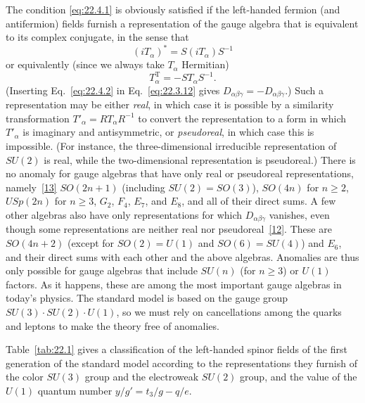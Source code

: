 The condition \eqref{eq:22.4.1} is obviously satisfied if the left-handed
fermion (and antifermion) fields furnish a representation of the gauge
algebra that is equivalent to its complex conjugate, in the sense that
\[
 (iT_\alpha)^*=S(iT_\alpha)S^{-1}
\]
or equivalently (since we always take $T_\alpha$ Hermitian)
\begin{equation}
 T_\alpha^{\mathrm T}=-S T_\alpha S^{-1}.
 \tag{22.4.2}\label{eq:22.4.2}
\end{equation}
(Inserting Eq.~\eqref{eq:22.4.2} in Eq.~\eqref{eq:22.3.12} gives
$D_{\alpha\beta\gamma}=-D_{\alpha\beta\gamma}$.) Such a representation
may be either \emph{real}, in which case it is possible by a similarity
transformation $T'_\alpha=R T_\alpha R^{-1}$ to convert the representation
to a form in which $T'_\alpha$ is imaginary and antisymmetric, or
\emph{pseudoreal}, in which case this is impossible. (For instance, the
three-dimensional irreducible representation of $SU(2)$ is real, while
the two-dimensional representation is pseudoreal.) There is no anomaly
for gauge algebras that have only real or pseudoreal representations,
namely~\hyperref[ch22-ref-13]{[13]} $SO(2n+1)$ (including
$SU(2)=SO(3)$), $SO(4n)$ for $n\geq2$, $USp(2n)$ for $n\geq3$,
$G_2$, $F_4$, $E_7$, and $E_8$, and all of their direct sums. A few other
algebras also have only representations for which
$D_{\alpha\beta\gamma}$ vanishes, even though some representations are
neither real nor pseudoreal~\hyperref[ch22-ref-12]{[12]}. These are
$SO(4n+2)$ (except for $SO(2)=U(1)$ and $SO(6)=SU(4)$) and $E_6$, and
their direct sums with each other and the above algebras. Anomalies are
thus only possible for gauge algebras that include $SU(n)$ (for $n\geq3$)
or $U(1)$ factors. As it happens, these are among the most important gauge
algebras in today's physics. The standard model is based on the gauge
group $SU(3)\cdot SU(2)\cdot U(1)$, so we must rely on cancellations among
the quarks and leptons to make the theory free of anomalies.

Table~\ref{tab:22.1} gives a classification of the left-handed spinor fields
of the first generation of the standard model according to the
representations they furnish of the color $SU(3)$ group and the electroweak
$SU(2)$ group, and the value of the $U(1)$ quantum number
$y/g'=t_3/g-q/e$.

